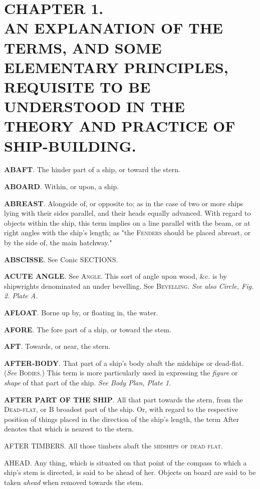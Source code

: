 \chapter[EXPLANATION OF TERMS, \&C. USED IN SHIP-BUILDING]{CHAPTER 1. \\
\footnotesize \singlespacing AN EXPLANATION OF THE TERMS, AND SOME ELEMENTARY PRINCIPLES, REQUISITE TO BE UNDERSTOOD IN THE THEORY AND PRACTICE OF SHIP-BUILDING.}

\textbf{ABAFT}. The hinder part of a ship, or toward the stern. 

\textbf{ABOARD}. Within, or upon, a ship. 

\textbf{ABREAST}. Alongside of, or opposite to; as in the case of two or more ships lying with their sides parallel, and their heads equally advanced. With regard to objects within the ship, this term implies on a line parallel with the beam, or at right angles with the ship's length; as "the \textsc{Fenders} should be placed abreast, or by the side of, the main hatchway."

\textbf{ABSCISSE}. See Conic SECTIONS. 

\textbf{ACUTE ANGLE}. See \textsc{Angle}. This sort of angle upon wood, \&c. is by shipwrights denominated an under bevelling. See \textsc{Bevelling}. \textit{See also Circle, Fig. 2. Plate A.}

\textbf{AFLOAT}. Borne up by, or floating in, the water.

\textbf{AFORE}. The fore part of a ship, or toward the stem. 

\textbf{AFT}. Towards, or near, the stern. 

\textbf{AFTER-BODY}. That part of a ship's body abaft the midships or dead-flat. (\textit{See} \textsc{Bodies}.) This term is more particularly used in expressing the \textit{figure} or \textit{shape} of that part of the ship. \textit{See Body Plan, Plate 1.} 

\textbf{AFTER PART OF THE SHIP}. All that part towards the stern, from the \textsc{Dead-flat}, or B broadest part of the ship. Or, with regard to the respective position of things placed in the direction of the ship's length, the term After denotes that which is nearest to the stern. 

\textsc{AFTER TIMBERS}. All those timbers abaft the \textsc{midships of dead flat}. 

\textsc{AHEAD}. Any thing, which is situated on that point of the compass to which a ship’s stem is directed, is said to be ahead of her. Objects on board are said to be taken \textit{ahead} when removed towards the stem. 

